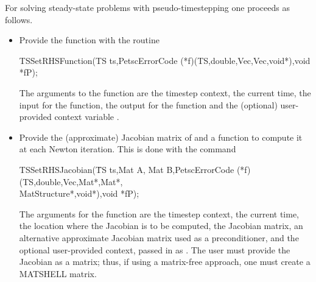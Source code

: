 For solving steady-state problems with pseudo-timestepping one proceeds 
as follows.
\begin{itemize}
\item Provide the function  with the routine
\begin{tabbing}
 TSSetRHSFunction(TS ts,PetscErrorCode (*f)(TS,double,Vec,Vec,void*),void *fP);
\end{tabbing}
The  arguments to the function  are
the timestep context, the current time, the input for the function,
the output for the function and the (optional) user-provided context
variable .

\item Provide the (approximate) Jacobian matrix of  and a 
function to compute it at each Newton iteration. This is done with the command
\begin{tabbing}
 TSSetRHSJacobian(\=TS ts,Mat A, Mat B,PetscErrorCode (*f)(TS,double,Vec,Mat*,Mat*,\\
                  \>        MatStructure*,void*),void *fP);
\end{tabbing}
The  arguments for the function  are
the timestep context, the current time, the location where the
Jacobian is to be computed, the Jacobian matrix, an alternative
approximate Jacobian matrix used as a preconditioner, and the optional
user-provided context, passed in as . The user must provide the 
Jacobian as a matrix; thus, if using a matrix-free approach, one 
must create a MATSHELL matrix.
\end{itemize}

